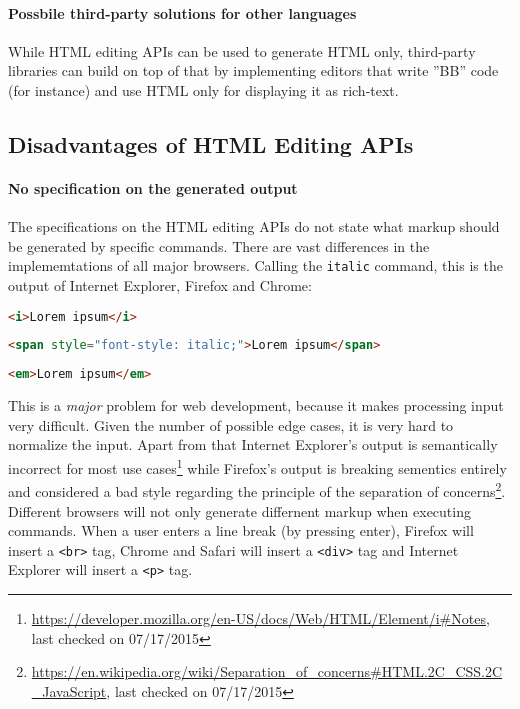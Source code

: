 \paragraph{Possbile third-party solutions for other languages}

While HTML editing APIs can be used to generate HTML only, third-party libraries can build on top of that by implementing editors that write ''BB'' code (for instance) and use HTML only for displaying it as rich-text.

\subsection{Disadvantages of HTML Editing APIs}


\paragraph{No specification on the generated output}

The specifications on the HTML editing APIs do not state what markup should be generated by specific commands. There are vast differences in the implememtations of all major browsers. Calling the \texttt{italic} command, this is the output of Internet Explorer, Firefox and Chrome:

\begin{lstlisting}[language=html, caption=Markup of italic command in Internet Explorer, label=lst:italic-ie]
<i>Lorem ipsum</i>
\end{lstlisting}

\begin{lstlisting}[language=html, caption=Markup of italic command in Firefox, label=lst:italic-firefox]
<span style="font-style: italic;">Lorem ipsum</span>
\end{lstlisting}

\begin{lstlisting}[language=html, caption=Markup of italic command in Chrome, label=lst:italic-chrome]
<em>Lorem ipsum</em>
\end{lstlisting}

\noindent This is a \textit{major} problem for web development, because it makes processing input very difficult. Given the number of possible edge cases, it is very hard to normalize the input. Apart from that Internet Explorer's output is semantically incorrect for most use cases\footnote{\url{https://developer.mozilla.org/en-US/docs/Web/HTML/Element/i\#Notes}, last checked on 07/17/2015} while Firefox's output is breaking sementics entirely and considered a bad style regarding the principle of the separation of concerns\footnote{\url{https://en.wikipedia.org/wiki/Separation\_of\_concerns\#HTML.2C\_CSS.2C\_JavaScript}, last checked on 07/17/2015}.
Different browsers will not only generate differnent markup when executing commands. When a user enters a line break (by pressing enter), Firefox will insert a \texttt{<br>} tag, Chrome and Safari will insert a \texttt{<div>} tag and Internet Explorer will insert a \texttt{<p>} tag.



